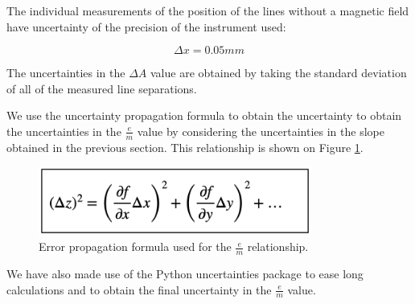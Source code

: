 The individual measurements of the position of the lines without a magnetic field have uncertainty of the precision of the instrument used:

\begin{equation}
    \Delta x = 0.05 mm
\end{equation}

The uncertainties in the $\Delta A$ value are obtained by taking the standard deviation of all of the measured line separations.

We use the uncertainty propagation formula to obtain the uncertainty to obtain the uncertainties in the $\frac{e}{m}$ value by considering the uncertainties in the slope obtained in the previous section.
This relationship is shown on Figure \ref{fig:error_propagation}.

\begin{figure}
    \centering
    \includegraphics[width=0.8\textwidth]{Appendix/Error_propagation.png}
    \caption{Error propagation formula used for the $\frac{e}{m}$ relationship.}
    \label{fig:error_propagation}
\end{figure}

We have also made use of the Python uncertainties package \cite{o.lebigotUncertaintiesPythonPackage} to ease long calculations and to obtain the final uncertainty in the $\frac{e}{m}$ value.
